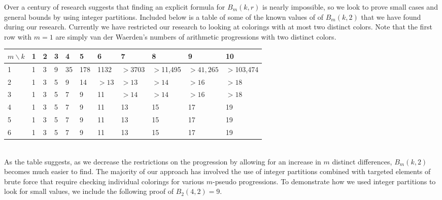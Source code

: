 \documentclass[ fontsize=10pt,twoside]{scrartcl}
\begin{document}
Over a century of research suggests that finding an explicit formula for $B_m(k,r)$ is nearly impossible, so we look to prove small cases and general bounds by using integer partitions. Included below is a table of some of the known values of of $B_m(k,2)$ that we have found during our research. Currently we have restricted our research to looking at colorings with at most two distinct colors. Note that the first row with $m = 1$ are simply van der Waerden's numbers of arithmetic progressions with two distinct colors.

\begin{center}
\begin{tabular}{ | m | m | m | m | m | m | m | m | m | m | m |  } 
\hline
$m\backslash k$& 1 & 2 & 3 & 4 & 5 & 6 & 7 & 8 & 9 & 10  \\ 
\hline
1 & 1 & 3 & 9 & 35 & 178  & 1132 & $>$3703  & $>$11,495 & $>41,265$  & $>$103,474   \\ 
\hline
2 & 1 & 3 & 5 & 9 & 14 & $>13$ & $>13$ & $>14$ & $>16$ & $>18$\\
\hline
3 & 1 & 3 & 5 & 7 & 9 & 11 & $>14$ & $>14$ & $>16$ & $>18$ \\
\hline
4 & 1 & 3 & 5 & 7 & 9 & 11 & 13 & 15 & 17 & 19  \\
\hline
5 & 1 & 3 & 5 & 7 & 9 & 11 & 13 & 15 & 17 & 19  \\
\hline
6 & 1 & 3 & 5 & 7 & 9 & 11 & 13 & 15 & 17 & 19 \\ 
\hline

\end{tabular}
\end{center}\\

\noindent As the table suggests, as we decrease the restrictions on the progression by allowing for an increase in $m$ distinct differences, $B_m(k,2)$ becomes much easier to find. The majority of our approach has involved the use of integer partitions combined with targeted elements of brute force that require checking individual colorings for various $m$-pseudo progressions. To demonstrate how we used integer partitions to look for small values, we include the following proof of $B_2(4,2) = 9$.
\end{document}
